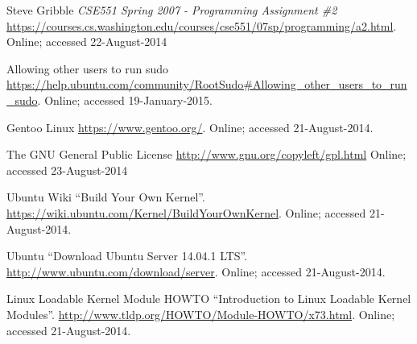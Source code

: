 \documentclass[11pt]{article}
\begin{document}
\begin{thebibliography}{3}

 Steve Gribble
	\newblock \emph{CSE551 Spring 2007 - Programming Assignment \#2}
	\newblock \url{https://courses.cs.washington.edu/courses/cse551/07sp/programming/a2.html}.
	\newblock Online; accessed 22-August-2014 

 Allowing other users to run sudo
	\newblock \url{https://help.ubuntu.com/community/RootSudo#Allowing_other_users_to_run_sudo}.
	\newblock Online; accessed 19-January-2015.	
	
 Gentoo Linux
	\newblock \url{https://www.gentoo.org/}.
	\newblock Online; accessed 21-August-2014.	
	
 The GNU General Public License
	\newblock \url{http://www.gnu.org/copyleft/gpl.html}
	\newblock Online; accessed 23-August-2014 


 Ubuntu Wiki
  \newblock ``Build Your Own Kernel''.
  \newblock
  \url{https://wiki.ubuntu.com/Kernel/BuildYourOwnKernel}.
  \newblock Online; accessed 21-August-2014.
  
 Ubuntu
  \newblock ``Download Ubuntu Server 14.04.1 LTS''.
  \newblock
  \url{ http://www.ubuntu.com/download/server}.
  \newblock Online; accessed 21-August-2014.
  
 
   
  
 Linux Loadable Kernel Module HOWTO
  \newblock ``Introduction to Linux Loadable Kernel Modules''.
  \newblock
  \url{http://www.tldp.org/HOWTO/Module-HOWTO/x73.html}.
  \newblock Online; accessed 21-August-2014.

\end{thebibliography}
\end{document}
